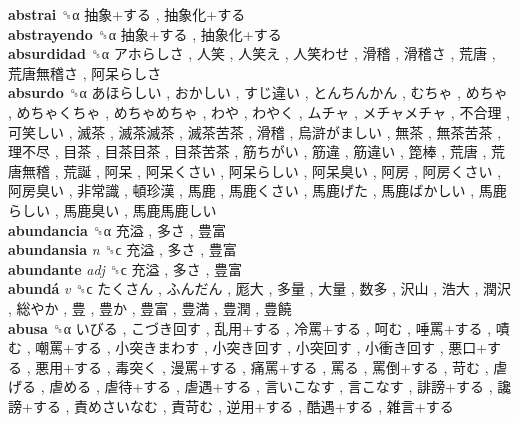 \textbf{abstrai} ␝α   抽象+する ,  抽象化+する   \\
\textbf{abstrayendo} ␝α   抽象+する ,  抽象化+する   \\
\textbf{absurdidad} ␝α   アホらしさ ,  人笑 ,  人笑え ,  人笑わせ ,  滑稽 ,  滑稽さ ,  荒唐 ,  荒唐無稽さ ,  阿呆らしさ   \\
\textbf{absurdo} ␝α   あほらしい ,  おかしい ,  すじ違い ,  とんちんかん ,  むちゃ ,  めちゃ ,  めちゃくちゃ ,  めちゃめちゃ ,  わや ,  わやく ,  ムチャ ,  メチャメチャ ,  不合理 ,  可笑しい ,  滅茶 ,  滅茶滅茶 ,  滅茶苦茶 ,  滑稽 ,  烏滸がましい ,  無茶 ,  無茶苦茶 ,  理不尽 ,  目茶 ,  目茶目茶 ,  目茶苦茶 ,  筋ちがい ,  筋違 ,  筋違い ,  箆棒 ,  荒唐 ,  荒唐無稽 ,  荒誕 ,  阿呆 ,  阿呆くさい ,  阿呆らしい ,  阿呆臭い ,  阿房 ,  阿房くさい ,  阿房臭い ,  非常識 ,  頓珍漢 ,  馬鹿 ,  馬鹿くさい ,  馬鹿げた ,  馬鹿ばかしい ,  馬鹿らしい ,  馬鹿臭い ,  馬鹿馬鹿しい   \\
\textbf{abundancia} ␝α   充溢 ,  多さ ,  豊富   \\
\textbf{abundansia} \emph{n}  ␝ϲ   充溢 ,  多さ ,  豊富   \\
\textbf{abundante} \emph{adj}  ␝ϲ   充溢 ,  多さ ,  豊富   \\
\textbf{abundá} \emph{v}  ␝ϲ   たくさん ,  ふんだん ,  厖大 ,  多量 ,  大量 ,  数多 ,  沢山 ,  浩大 ,  潤沢 ,  総やか ,  豊 ,  豊か ,  豊富 ,  豊満 ,  豊潤 ,  豊饒   \\
\textbf{abusa} ␝α   いびる ,  こづき回す ,  乱用+する ,  冷罵+する ,  呵む ,  唾罵+する ,  嘖む ,  嘲罵+する ,  小突きまわす ,  小突き回す ,  小突回す ,  小衝き回す ,  悪口+する ,  悪用+する ,  毒突く ,  漫罵+する ,  痛罵+する ,  罵る ,  罵倒+する ,  苛む ,  虐げる ,  虐める ,  虐待+する ,  虐遇+する ,  言いこなす ,  言こなす ,  誹謗+する ,  讒謗+する ,  責めさいなむ ,  責苛む ,  逆用+する ,  酷遇+する ,  雑言+する   \\
